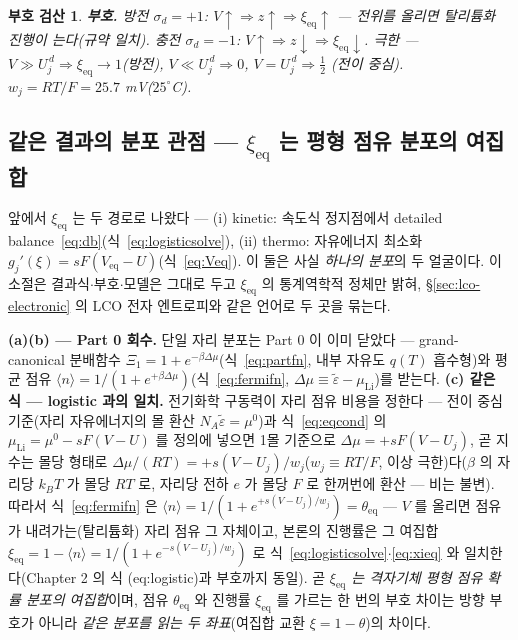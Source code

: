 \documentclass[11pt,a4paper]{article}
\newtheorem*{signbox}{부호 검산}
\newcommand{\eq}{\mathrm{eq}}
\begin{document}
\begin{signbox}
\textbf{부호.} 방전 $\sigma_d=+1$: $V\!\uparrow\Rightarrow z\!\uparrow\Rightarrow\xi_\eq\!\uparrow$ — 전위를 올리면
탈리튬화 진행이 는다(규약 일치). 충전 $\sigma_d=-1$: $V\!\uparrow\Rightarrow z\!\downarrow\Rightarrow\xi_\eq\!\downarrow$.
극한 — $V\gg U_j^{\,d}\Rightarrow\xi_\eq\to1$(방전), $V\ll U_j^{\,d}\Rightarrow0$, $V=U_j^{\,d}\Rightarrow\tfrac12$
(전이 중심). $w_j=RT/F=25.7$ mV($25^\circ$C).
\end{signbox}

\subsection{같은 결과의 분포 관점 — $\xi_\eq$ 는 평형 점유 분포의 여집합}\label{sec:dist}
앞에서 $\xi_\eq$ 는 두 경로로 나왔다 — (i) kinetic: 속도식 정지점에서 detailed balance~\eqref{eq:db}(식~\eqref{eq:logisticsolve}),
(ii) thermo: 자유에너지 최소화 $g_j'(\xi)=sF(V_\eq-U)$(식~\eqref{eq:Veq}). 이 둘은 사실 \emph{하나의 분포}의 두 얼굴이다.
이 소절은 결과식$\cdot$부호$\cdot$모델은 그대로 두고 $\xi_\eq$ 의 통계역학적 정체만 밝혀,
\S\ref{sec:lco-electronic} 의 LCO 전자 엔트로피와 같은 언어로 두 곳을 묶는다.

\textbf{(a)(b) --- Part 0 회수.} 단일 자리 분포는 Part 0 이 이미 닫았다 --- grand-canonical
분배함수 $\Xi_1=1+e^{-\beta\Delta\mu}$(식~\eqref{eq:partfn}, 내부 자유도 $q(T)$ 흡수형)와 평균 점유
$\langle n\rangle=1/(1+e^{+\beta\Delta\mu})$(식~\eqref{eq:fermifn},
$\Delta\mu\equiv\tilde\varepsilon-\mu_\mathrm{Li}$)를 받는다. \textbf{(c) 같은 식 --- logistic 과의 일치.}
전기화학 구동력이 자리 점유 비용을 정한다 --- 전이 중심 기준(자리 자유에너지의 몰 환산 $N_A\tilde\varepsilon=\mu^0$)과
식~\eqref{eq:eqcond} 의 $\mu_\mathrm{Li}=\mu^0-sF(V-U)$ 를 정의에 넣으면 1몰 기준으로
$\Delta\mu=+sF(V-U_j)$, 곧 지수는 몰당 형태로
$\Delta\mu/(RT)=+s(V-U_j)/w_j$($w_j\equiv RT/F$, 이상 극한)다($\beta$ 의 자리당 $k_BT$ 가 몰당 $RT$ 로,
자리당 전하 $e$ 가 몰당 $F$ 로 한꺼번에 환산 --- 비는 불변). 따라서 식~\eqref{eq:fermifn} 은
$\langle n\rangle=1/(1+e^{+s(V-U_j)/w_j})=\theta_\eq$ --- $V$ 를 올리면 점유가 내려가는(탈리튬화) 자리 점유
그 자체이고, 본론의 진행률은 그 여집합 $\xi_\eq=1-\langle n\rangle=1/(1+e^{-s(V-U_j)/w_j})$ 로
식~\eqref{eq:logisticsolve}$\cdot$\eqref{eq:xieq} 와 일치한다(Chapter 2 의 식 (eq:logistic)과 부호까지 동일).
곧 \emph{$\xi_\eq$ 는 격자기체 평형 점유 확률 분포의 여집합}이며, 점유 $\theta_\eq$ 와 진행률 $\xi_\eq$ 를
가르는 한 번의 부호 차이는 방향 부호가 아니라 \emph{같은 분포를 읽는 두 좌표}(여집합 교환
$\xi=1-\theta$)의 차이다.
\end{document}
